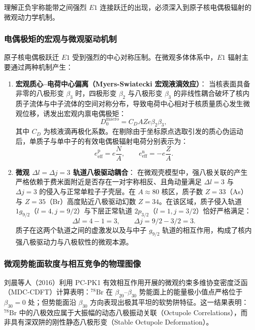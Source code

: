 理解正负宇称能带之间强烈 $E1$ 连接跃迁的出现，必须深入到原子核电偶极辐射的微观动力学机制。

\subsubsection{电偶极矩的宏观与微观驱动机制}

原子核电偶极跃迁 $E1$ 受到强烈的中心对称压制。在微观多体体系中，$E1$ 辐射主要通过两种机制产生：
\begin{enumerate}
\item \textbf{宏观质心--电荷中心偏离（Myers-Swiatecki 宏观液滴效应）}：
当核表面具备非零的八极形变 $\beta_3$ 时，四极形变 $\beta_2$ 与八极形变 $\beta_3$ 的非线性耦合破坏了核内质子流体与中子流体的空间对称分布，导致电荷中心相对于核质量质心发生微观位移，诱发出宏观内禀电偶极矩：
\begin{equation}\label{eq:4-5-myers-dipole}
D_0^{\text{macro}} = C_D A Z e \beta_2 \beta_3,
\end{equation}
其中 $C_D$ 为核液滴再极化系数。在剔除由于坐标原点选取引发的质心伪运动后，单质子与单中子的有效电偶极辐射电荷分别表示为：
\begin{equation}\label{eq:4-5-effective-charge}
e_{\text{eff}}^{\text{p}} = e \frac{N}{A}, \qquad e_{\text{eff}}^{\text{n}} = -e \frac{Z}{A}.
\end{equation}
\item \textbf{微观 $\Delta l = \Delta j = 3$ 轨道八极驱动耦合}：
在微观壳模型中，强八极关联的产生严格依赖于费米面附近是否存在一对宇称相反、且角动量满足 $\Delta l = 3$ 与 $\Delta j = 3$ 的侵入与正常单粒子子壳层。在 $A \approx 80$ 核区，质子数 $Z=33$（As）与 $Z=35$（Br）高度贴近八极驱动幻数 $Z=34$。在该区域，质子侵入轨道 $1g_{9/2}$（$l=4, j=9/2$）与下层正常轨道 $2p_{3/2}$（$l=1, j=3/2$）恰好严格满足：
\begin{equation}\label{eq:4-5-octupole-selection}
\Delta l = 4 - 1 = 3, \qquad \Delta j = 9/2 - 3/2 = 3.
\end{equation}
质子在这两个轨道之间的虚激发以及与中子 $g_{9/2}$ 轨道的相互作用，构成了核内强八极驱动力与八极软性的微观本源。
\end{enumerate}

\subsubsection{微观势能面软度与相互竞争的物理图像}

刘晨等人（2016）利用 PC-PK1 有效相互作用开展的微观约束多维协变密度泛函（MDC-CDFT）计算表明：$^{78}\mathrm{Br}$ 在 $\beta_{20}$--$\beta_{30}$ 势能面上的能量极小值点严格位于 $\beta_{30} = 0$ 处；但势能面沿 $\beta_{30}$ 方向表现出极其平坦的软势阱特征。这一结果表明：$^{78}\mathrm{Br}$ 中的八极效应属于大振幅的动态八极振动关联（Octupole Correlations），而非具有深双阱的刚性静态八极形变（Stable Octupole Deformation）。

